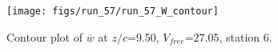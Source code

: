 \begin{figure}[H]
\centering
\texttt{[image: figs/run\_57/run\_57\_W\_contour]}
\caption{Contour plot of $\overline{w}$ at $z/c$=9.50, $V_{free}$=27.05, station 6.}
\label{fig:run_57_W_contour}
\end{figure}



